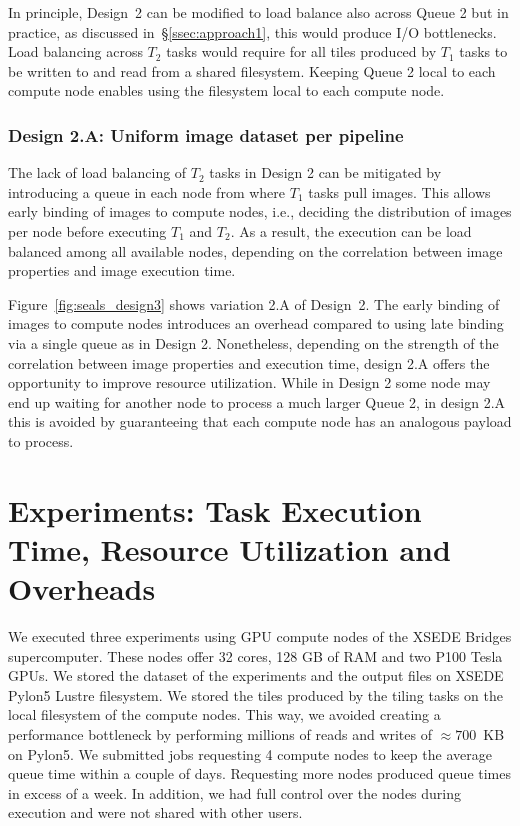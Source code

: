 In principle, Design~2 can be modified to load balance also across Queue 2 but 
in practice, as discussed in~\S\ref{ssec:approach1}, this would produce I/O 
bottlenecks. Load balancing across $T_{2}$ tasks would require for all tiles 
produced by $T_{1}$ tasks to be written to and read  from a  shared filesystem.
Keeping Queue 2 local to each compute node enables using the filesystem local 
to each compute node.

\subsubsection{Design 2.A: Uniform image dataset per pipeline}
\label{sssec:approach2a}

The lack of load balancing of $T_{2}$ tasks in Design 2 can be mitigated by 
introducing a queue in each node from where $T_{1}$ tasks pull images. This 
allows early binding of images to compute nodes, i.e., deciding the 
distribution of images per node before executing $T_{1}$ and $T_{2}$. As a 
result, the execution can be load balanced among all available nodes, 
depending on the correlation between image properties and image execution time.

Figure~\ref{fig:seals_design3} shows variation 2.A of Design~2. The early 
binding of images to compute nodes introduces an overhead compared to using 
late binding via a single queue as in Design 2. Nonetheless, depending on the 
strength of the correlation between image properties and execution time, 
design 2.A offers the opportunity to improve resource utilization. While in 
Design 2 some node may end up waiting for another node to process a much 
larger Queue 2, in design 2.A this is avoided by guaranteeing that each 
compute node has an analogous payload to process.

\section{Experiments: Task Execution Time, Resource Utilization and Overheads}\label{sec:des_experiments}
We executed three experiments using GPU compute nodes of the XSEDE Bridges 
supercomputer. These nodes offer 32 cores, 128 GB of RAM and two P100 Tesla 
GPUs. We stored the dataset of the experiments and the output files on XSEDE 
Pylon5 Lustre filesystem. We stored the tiles produced by the tiling tasks on 
the local filesystem of the compute nodes. This way, we avoided creating a 
performance bottleneck by performing millions of reads and writes of 
$\approx700$~KB on Pylon5. We submitted jobs requesting 4 compute nodes to 
keep the average queue time within a couple of days. Requesting more nodes 
produced queue times in excess of a week. In addition, we had full control 
over the nodes during execution and were not shared with other users.

